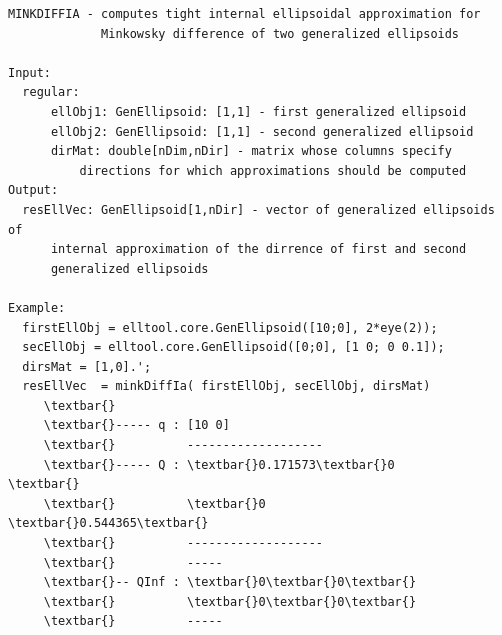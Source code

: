 \documentclass[letterpaper,10pt,english]{sphinxmanual}
\begin{document}
\begin{Verbatim}[commandchars=\\\{\}]
MINKDIFFIA - computes tight internal ellipsoidal approximation for
             Minkowsky difference of two generalized ellipsoids

Input:
  regular:
      ellObj1: GenEllipsoid: [1,1] - first generalized ellipsoid
      ellObj2: GenEllipsoid: [1,1] - second generalized ellipsoid
      dirMat: double[nDim,nDir] - matrix whose columns specify
          directions for which approximations should be computed
Output:
  resEllVec: GenEllipsoid[1,nDir] - vector of generalized ellipsoids of
      internal approximation of the dirrence of first and second
      generalized ellipsoids

Example:
  firstEllObj = elltool.core.GenEllipsoid([10;0], 2*eye(2));
  secEllObj = elltool.core.GenEllipsoid([0;0], [1 0; 0 0.1]);
  dirsMat = [1,0].';
  resEllVec  = minkDiffIa( firstEllObj, secEllObj, dirsMat)
     \textbar{}
     \textbar{}----- q : [10 0]
     \textbar{}          -------------------
     \textbar{}----- Q : \textbar{}0.171573\textbar{}0       \textbar{}
     \textbar{}          \textbar{}0       \textbar{}0.544365\textbar{}
     \textbar{}          -------------------
     \textbar{}          -----
     \textbar{}-- QInf : \textbar{}0\textbar{}0\textbar{}
     \textbar{}          \textbar{}0\textbar{}0\textbar{}
     \textbar{}          -----
\end{Verbatim}
\end{document}
